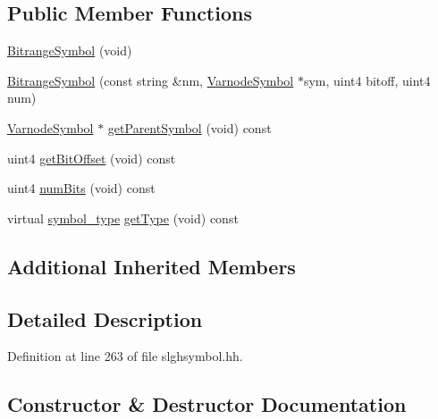 \subsection*{Public Member Functions}
\begin{DoxyCompactItemize}
\item 
\mbox{\hyperlink{class_bitrange_symbol_a6ce9fc86a9fb6707cbcf592af9da4e02}{Bitrange\+Symbol}} (void)
\item 
\mbox{\hyperlink{class_bitrange_symbol_a535c5e6e47b0a2eca15c25799426220d}{Bitrange\+Symbol}} (const string \&nm, \mbox{\hyperlink{class_varnode_symbol}{Varnode\+Symbol}} $\ast$sym, uint4 bitoff, uint4 num)
\item 
\mbox{\hyperlink{class_varnode_symbol}{Varnode\+Symbol}} $\ast$ \mbox{\hyperlink{class_bitrange_symbol_a495e75ab346ccecc67873ba516749b49}{get\+Parent\+Symbol}} (void) const
\item 
uint4 \mbox{\hyperlink{class_bitrange_symbol_ab47d00ea2079c1cf7f12cbb648e8e08b}{get\+Bit\+Offset}} (void) const
\item 
uint4 \mbox{\hyperlink{class_bitrange_symbol_a9a7b25931b2c3ad792d3af805cc72000}{num\+Bits}} (void) const
\item 
virtual \mbox{\hyperlink{class_sleigh_symbol_aba70f7f332fd63488c5ec4bd7807db41}{symbol\+\_\+type}} \mbox{\hyperlink{class_bitrange_symbol_aa8c892a1391e81d799d56cfc2318a6fd}{get\+Type}} (void) const
\end{DoxyCompactItemize}
\subsection*{Additional Inherited Members}


\subsection{Detailed Description}


Definition at line 263 of file slghsymbol.\+hh.



\subsection{Constructor \& Destructor Documentation}
\mbox{\label{class_bitrange_symbol_a6ce9fc86a9fb6707cbcf592af9da4e02}} 

